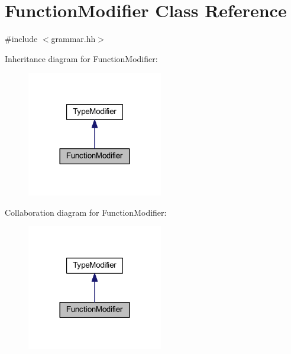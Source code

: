 \hypertarget{class_function_modifier}{}\section{Function\+Modifier Class Reference}
\label{class_function_modifier}


{\ttfamily \#include $<$grammar.\+hh$>$}



Inheritance diagram for Function\+Modifier\+:
\nopagebreak
\begin{figure}[H]
\begin{center}
\leavevmode
\includegraphics[width=168pt]{class_function_modifier__inherit__graph}
\end{center}
\end{figure}


Collaboration diagram for Function\+Modifier\+:
\nopagebreak
\begin{figure}[H]
\begin{center}
\leavevmode
\includegraphics[width=168pt]{class_function_modifier__coll__graph}
\end{center}
\end{figure}
